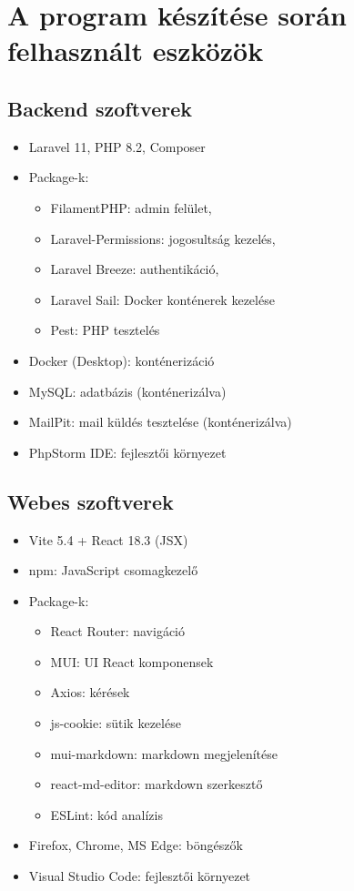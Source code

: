 \section{A program készítése során felhasznált eszközök}
\label{sec:softwares}

\subsection{Backend szoftverek}

\begin{itemize}
    \item Laravel 11, PHP 8.2, Composer
    \item Package-k: 
    \begin{itemize}
        \item FilamentPHP: admin felület,
        \item Laravel-Permissions: jogosultság kezelés,
        \item Laravel Breeze: authentikáció,
        \item Laravel Sail: Docker konténerek kezelése
        \item Pest: PHP tesztelés
    \end{itemize}
    \item Docker (Desktop): konténerizáció
    \item MySQL: adatbázis (konténerizálva)
    \item MailPit: mail küldés tesztelése (konténerizálva)
    \item PhpStorm IDE: fejlesztői környezet
\end{itemize}

\subsection{Webes szoftverek}

\begin{itemize}
    \item Vite 5.4 + React 18.3 (JSX)
    \item npm: JavaScript csomagkezelő
    \item Package-k: 
    \begin{itemize}
        \item React Router: navigáció
        \item MUI: UI React komponensek
        \item Axios: kérések
        \item js-cookie: sütik kezelése
        \item mui-markdown: markdown megjelenítése
        \item react-md-editor: markdown szerkesztő
        \item ESLint: kód analízis
    \end{itemize}
    \item Firefox, Chrome, MS Edge: böngészők
    \item Visual Studio Code: fejlesztői környezet
\end{itemize}


